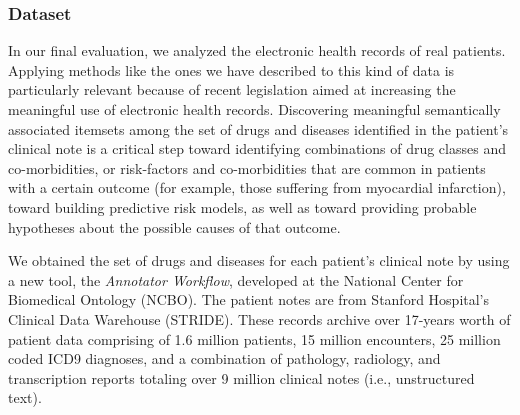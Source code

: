 \subsubsection{Dataset}
In our final evaluation, we analyzed the electronic health records of real patients. Applying methods like the ones we have described to this kind of data is particularly relevant because of recent legislation aimed at increasing the meaningful use of electronic health records. Discovering meaningful semantically associated itemsets among the set of drugs and diseases identified in the patient's clinical note is a critical step toward identifying combinations of drug classes and co-morbidities, or risk-factors and co-morbidities that are common in patients with a certain outcome (for example, those suffering from myocardial infarction), toward building predictive risk models, as well as toward providing probable hypotheses about the possible causes of that outcome.  %

We obtained the set of drugs and diseases for each patient's clinical note by using a new tool, the \emph{Annotator Workflow}, developed at the National Center for Biomedical Ontology (NCBO).  The patient notes are from Stanford Hospital's Clinical Data Warehouse (STRIDE).  These records archive over 17-years worth of patient data comprising of 1.6 million patients, 15 million encounters, 25 million coded ICD9 diagnoses, and a combination of pathology, radiology, and transcription reports totaling over 9 million clinical notes (i.e., unstructured text).



